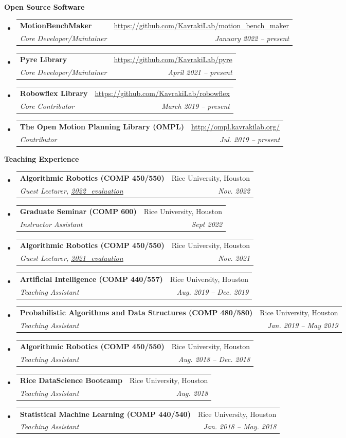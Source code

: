 \documentclass[letterpaper,11pt]{article}
\makeatletter
\newcommand{\resheading}[1]{{\large \colorbox{mygrey}{\begin{minipage}{\textwidth}{\textbf{#1 \vphantom{p\^{E}}}}\end{minipage}}}}
\newcommand{\ressubheading}[4]{
\begin{tabular*}{7.0in}{l@{\extracolsep{\fill}}r}
		\textbf{#1} & #2 \\
		\textit{#3} & \textit{#4} \\
\end{tabular*}\vspace{-6pt}}
\makeatother
\begin{document}
\pagebreak

\resheading{Open Source Software}
\begin{itemize}
	\item \ressubheading{MotionBenchMaker}
	{\url{https://github.com/KavrakiLab/motion_bench_maker}}{Core Developer/Maintainer}{January 2022 -- present}
	\item \ressubheading{Pyre Library}
	{\url{https://github.com/KavrakiLab/pyre}}{Core Developer/Maintainer}{April 2021 -- present}
	\item \ressubheading{Robowflex Library}
	{\url{https://github.com/KavrakiLab/robowflex}}{Core Contributor}{March 2019 -- present}
	\item \ressubheading{The Open Motion Planning Library (OMPL)}
	{\url{http://ompl.kavrakilab.org/}}{Contributor}{Jul. 2019 -- present}
\end{itemize}	

\resheading{Teaching Experience}
\begin{itemize}
  	\item
    \ressubheading{Algorithmic Robotics (COMP  450/550) }
    {Rice University, Houston}{Guest Lecturer, \href{https://www.dropbox.com/s/f7ico17ertipn59/evaluation2022.pdf?dl=0}{\underline{2022\_evaluation}}}
    {Nov. 2022}
    \item
	\ressubheading{Graduate Seminar (COMP  600) }
	{Rice University, Houston}{Instructor Assistant}
	{Sept 2022}
	\item
	\ressubheading{Algorithmic Robotics (COMP  450/550) }
	{Rice University, Houston}{Guest Lecturer, \href{https://www.dropbox.com/s/0jlt9hmkzxt81sa/evaluation2021.pdf?dl=0}{\underline{2021\_evaluation}}}
	{Nov. 2021}
	\item
	\ressubheading{Artificial Intelligence (COMP  440/557) }
	{Rice University, Houston}{Teaching Assistant}
	{Aug. 2019 -- Dec. 2019}
	\item
	\ressubheading{Probabilistic Algorithms and Data Structures (COMP  480/580)}
	{Rice University, Houston}{Teaching Assistant}
	{Jan. 2019 -- May 2019}
	\item
	\ressubheading{Algorithmic Robotics (COMP  450/550) }
	{Rice University, Houston}{Teaching Assistant}
	{Aug. 2018 -- Dec. 2018}
	\item
	\ressubheading{Rice DataScience Bootcamp}
	{Rice University, Houston}{Teaching Assistant}
	{Aug. 2018}
	\item
	\ressubheading{Statistical Machine Learning (COMP 440/540)}
	{Rice University, Houston}{Teaching Assistant}
	{Jan. 2018 -- May. 2018}
\end{itemize}
\end{document}
